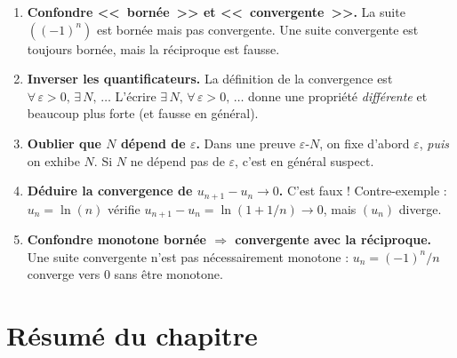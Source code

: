 \documentclass[12pt,a4paper,openany]{book}
\theoremstyle{definition}
\newcommand{\eps}{\varepsilon}
\begin{document}
\begin{enumerate}[label=\textbf{E\arabic*.}, leftmargin=2cm]
  \item \textbf{Confondre <<~bornée~>> et <<~convergente~>>.}
    La suite $((-1)^n)$ est bornée mais pas convergente. Une suite convergente est toujours
    bornée, mais la réciproque est fausse.

  \item \textbf{Inverser les quantificateurs.}
    La définition de la convergence est $\forall\, \eps > 0,\, \exists\, N,\, \ldots$
    L'écrire $\exists\, N,\, \forall\, \eps > 0,\, \ldots$ donne une propriété
    \emph{différente} et beaucoup plus forte (et fausse en général).

  \item \textbf{Oublier que $N$ dépend de $\eps$.}
    Dans une preuve $\eps$-$N$, on fixe d'abord $\eps$, \emph{puis} on exhibe $N$.
    Si $N$ ne dépend pas de $\eps$, c'est en général suspect.

  \item \textbf{Déduire la convergence de $u_{n+1} - u_n \to 0$.}
    C'est faux ! Contre-exemple : $u_n = \ln(n)$ vérifie $u_{n+1} - u_n = \ln(1 + 1/n) \to 0$,
    mais $(u_n)$ diverge.

  \item \textbf{Confondre monotone bornée $\Rightarrow$ convergente avec la réciproque.}
    Une suite convergente n'est pas nécessairement monotone : $u_n = (-1)^n/n$ converge
    vers $0$ sans être monotone.
\end{enumerate}

\section{Résumé du chapitre}\label{sec:suites:resume}
\end{document}
